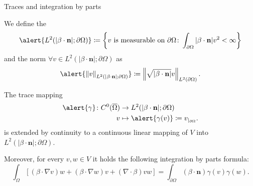 	\begin{frame}[allowframebreaks]{Traces and integration by parts}
		\begin{definicion}
			We define the  $$\alert{L^2(|\beta\cdot\mathbf{n}|;\partial\Omega)}\coloneqq\left\{v\text{ is measurable on }\partial\Omega\colon\int_{\partial\Omega}|\beta\cdot\mathbf{n}|v^2<\infty \right\}$$ and the norm $\forall v\in L^2(|\beta\cdot\mathbf{n}|;\partial\Omega)$ as $$\alert{\norma{v}_{L^2(|\beta\cdot\mathbf{n}|;\partial\Omega)}}\coloneqq\norma{\sqrt{|\beta\cdot\mathbf{n}|}v}_{L^2(\partial\Omega)}.$$
			\end{definicion}
	\begin{lemma}
	The trace mapping
	\begin{align*}
	\alert{\gamma}\colon {C}^0(\overline{\Omega})&\to L^2(|\beta\cdot\mathbf{n}|;\partial\Omega)\\
	v	&\mapsto\alert{\gamma(v)}\coloneqq v_{|_{\partial\Omega}}.
	\end{align*}
	is extended by continuity to a continuous linear mapping of $V$ into $L^2(|\beta\cdot\mathbf{n}|;\partial\Omega)$.
	 
	
	Moreover, for every $v,w\in V$ it holds the following integration by parts formula: $$\int_\Omega\left[(\beta\cdot\nabla v)w+(\beta\cdot\nabla w)v+(\nabla\cdot\beta)vw\right]=\int_{\partial\Omega}(\beta\cdot \mathbf{n})\gamma(v)\gamma(w).$$
	\end{lemma}
	
	\end{frame}
	
